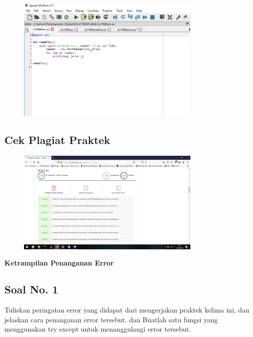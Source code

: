\begin{figure}[H]
	\includegraphics[width=9cm]{figures/5/1174089/Praktek/csv.png}
	\centering
\end{figure}

\subsection{Cek Plagiat Praktek}
\begin{figure}[H]
	\includegraphics[width=9cm]{figures/5/1174089/Praktek/plagiatpraktek.png}
	\centering
\end{figure}

\hfill \break
{\Large \textbf{Ketrampilan Penanganan Error}}

\subsection{Soal No. 1}
Tuliskan  peringatan  error  yang  didapat  dari  mengerjakan  praktek  kelima  ini, dan  jelaskan  cara  penanganan  error  tersebut.   dan  Buatlah  satu  fungsi  yang menggunakan try except untuk menanggulangi error tersebut.

